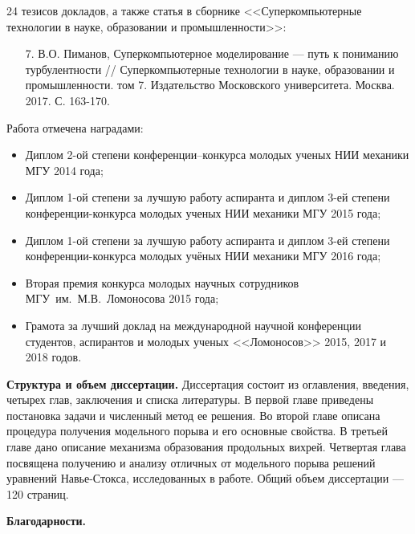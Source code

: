 24 тезисов докладов, а также статья в сборнике <<Суперкомпьютерные технологии в науке, образовании и промышленности>>:
\begin{enumerate}
\item[7.] В.О. Пиманов, Суперкомпьютерное моделирование --- путь к пониманию турбулентности // Суперкомпьютерные технологии в науке, образовании и промышленности. том 7. Издательство Московского университета. Москва. 2017. С.  163-170. 
\end{enumerate}
Работа отмечена наградами:
\begin{itemize}
\item Диплом 2-ой степени конференции--конкурса молодых ученых НИИ механики МГУ 2014 года;
\item Диплом 1-ой степени за лучшую работу аспиранта и диплом 3-ей степени конференции-конкурса молодых ученых НИИ механики МГУ 2015 года;
\item Диплом 1-ой степени за лучшую работу аспиранта и диплом 3-ей степени конференции-конкурса молодых учёных НИИ механики МГУ 2016 года;
\item Вторая премия конкурса молодых научных сотрудников МГУ~им.~М.В.~Ломоносова 2015 года;
\item Грамота за лучший доклад на международной научной конференции студентов, аспирантов и молодых ученых <<Ломоносов>> 2015, 2017 и 2018 годов.
\end{itemize}


{\bf Структура и объем диссертации.} 
Диссертация состоит из оглавления, введения, четырех глав, заключения и списка литературы. В первой главе приведены постановка задачи и численный метод ее решения. Во второй главе описана процедура получения модельного порыва и его основные свойства. В третьей главе дано описание механизма образования продольных вихрей. Четвертая глава посвящена получению и анализу отличных от модельного порыва решений уравнений Навье-Стокса, исследованных в работе. Общий объем диссертации --- 120 страниц. %

{\bf Благодарности.}


